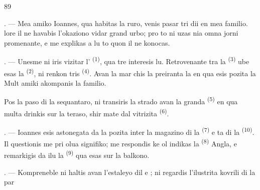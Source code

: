 %

\begin{VUpage}[91]{89}
\VUsaut{4.0mm}
\VUsaut{3.0mm}

\VUsaut{3.0mm}

. --- Mea amiko Ioannes, qua habitas la\nl
ruro, venis pasar tri dii en mea familio. \nl
lore il ne havabis l'okaziono vidar grand urbo;\nl
pro to ni uzas nia omna jorni promenante, e\nl
me explikas a lu to quon il ne konocas.

. --- Unesme ni iris vizitar l' \textsuperscript{(1)},\nl
qua tre interesis lu. Retrovenante tra la \cc
{} \textsuperscript{(3)} ube esas la  \textsuperscript{(2)}, ni renkon\cc
tris  \textsuperscript{(4)}. Avan la  mar\cc
chis la  preiranta la \cc
{} en qua esis pozita la  Mult amiki\nl
akompanis la  familio.

\VUblancAlinea
Pos la paso di la sequantaro, ni transiris la\nl
strado avan la granda  \textsuperscript{(5)} en qua multa\nl
{} drinkis  sur la teraso, shir\cc
mate dal vitrizita  \textsuperscript{(6)}.

. --- Ioannes esis astonegata da la \nl
pozita inter la magazino di la  \textsuperscript{(7)} e\nl
ta di la  \textsuperscript{(10)}. Il questionis me\nl
pri olua signifiko; me respondis ke ol indikas\nl
la  \textsuperscript{(8)} Angla, e remarkigis da ilu la\nl
{} \textsuperscript{(9)} qua esas sur la balkono.

\VUsaut{3.0mm}

. --- Kompreneble ni haltis avan l'estaleyo\nl
dil    e\nl
{}; ni regardis l'ilustrita kovrili di la par\cc
\parplein
\end{VUpage}


